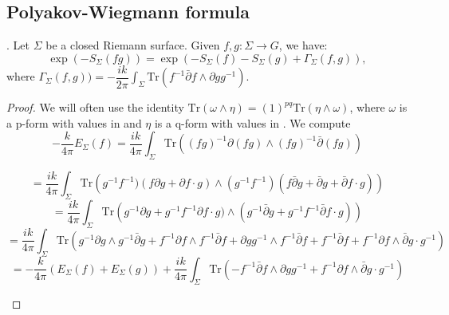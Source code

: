 \subsection{Polyakov-Wiegmann formula}
\begin{proposition}. Let $\Sigma$ be a closed Riemann surface. Given $f,g: \Sigma \rightarrow G$,
 we have:
 \begin{equation*}
  \exp(-S_{\Sigma}(fg)) = \exp(-S_{\Sigma}(f) - S_{\Sigma}(g) + \Gamma_{\Sigma}(f,g)),
 \end{equation*}
where $\Gamma_{\Sigma}(f,g)) = - \dfrac{ik}{2\pi} \int_{\Sigma} \mathrm{Tr}(f^{-1}\bar{\partial} f \wedge \partial g g^{-1}).$

\end{proposition}
\begin{proof}
 We will often use the identity 
 $\mathrm{Tr}(\omega \wedge \eta) = (1)^{pq}\mathrm{Tr}(\eta \wedge \omega)$,
 where $\omega$ is a p-form with values in \gg and $\eta$ is a q-form with values in \gg.
 We compute 
 \begin{equation*}
  -\dfrac{k}{4\pi} E_{\Sigma}(f) = \dfrac{ik}{4 \pi}\int_{\Sigma} 
  \mathrm{Tr}\left(\left( fg\right)^{-1}\partial(fg)\wedge
  (fg)^{-1}\bar{\partial}(fg)\right)
 \end{equation*}
\begin{flushright}
 \begin{equation*}
   = \dfrac{ik}{4 \pi}\int_{\Sigma} \mathrm{Tr}\left(g^{-1}f^{-1})(f\partial g + 
   \partial f \cdot g) \wedge (g^{-1} f^{-1})(f\bar{\partial}
   g + \bar{\partial} g + \bar{\partial} f \cdot g)\right)
 \end{equation*}
\begin{equation*}
 = \dfrac{ik}{4 \pi}\int_{\Sigma} \mathrm{Tr}\left(g^{-1}\partial g + g^{-1} f^{-1} \partial f \cdot g) \wedge 
 (g^{-1}\bar{\partial}
   g + g^{-1} f^{-1} \bar{\partial} f \cdot g)\right)
\end{equation*}
\begin{equation*}
 = \dfrac{ik}{4 \pi}\int_{\Sigma} \mathrm{Tr}\left(g^{-1} \partial g \wedge  g^{-1} \bar{\partial} g + f^{-1} 
 \partial  f
 \wedge f^{-1} \bar{\partial} f + \partial g g^{-1} \wedge f^{-1} \bar{\partial} f 
 + f^{-1} \bar{\partial}f + f^{-1} \partial f \wedge \bar{\partial} g \cdot g^{-1}\right)
\end{equation*}
\begin{equation*}
 = - \dfrac{k}{4 \pi} \left( E_{\Sigma} (f) + E_{\Sigma} (g)\right)  + \dfrac{ik}{4\pi} \int_{\Sigma}
 \mathrm{Tr}\left(-f^{-1} \bar{\partial}f \wedge \partial g g^{-1} + f^{-1} \partial f
\wedge \bar{\partial} g \cdot g^{-1} \right)
\end{equation*}


\end{flushright}
\end{proof}
